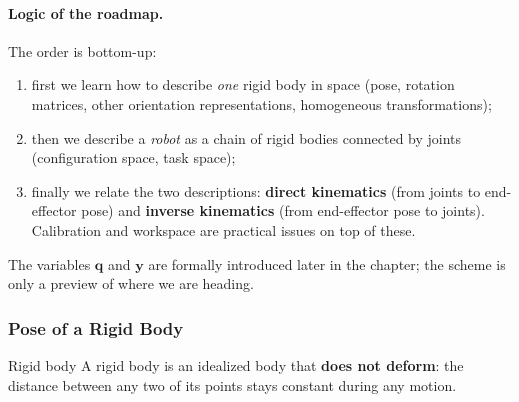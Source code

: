 \paragraph{Logic of the roadmap.} The order is bottom-up:
\begin{enumerate}
    \item first we learn how to describe \emph{one} rigid body in space (pose, rotation matrices, other orientation representations, homogeneous transformations);
    \item then we describe a \emph{robot} as a chain of rigid bodies connected by joints (configuration space, task space);
    \item finally we relate the two descriptions: \textbf{direct kinematics} (from joints to end-effector pose) and \textbf{inverse kinematics} (from end-effector pose to joints). Calibration and workspace are practical issues on top of these.
\end{enumerate}

\begin{center}
\end{center}

The variables $\mathbf{q}$ and $\mathbf{y}$ are formally introduced later in the chapter; the scheme is only a preview of where we are heading.

\subsubsection{Pose of a Rigid Body}

\begin{defbox}{Rigid body}
A rigid body is an idealized body that \textbf{does not deform}: the distance between any two of its points stays constant during any motion.
\end{defbox}

